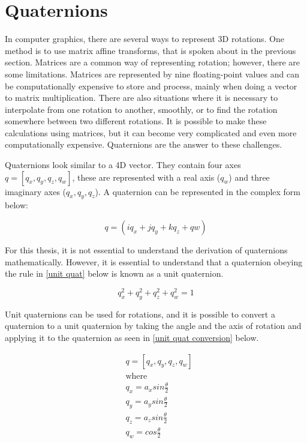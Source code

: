 \section{Quaternions}

In computer graphics, there are several ways to represent 3D rotations. One method is to use matrix affine transforms, that is spoken about in the previous section. Matrices are a common way of representing rotation; however, there are some limitations. Matrices are represented by nine floating-point values and can be computationally expensive to store and process, mainly when doing a vector to matrix multiplication. There are also situations where it is necessary to interpolate from one rotation to another, smoothly, or to find the rotation somewhere between two different rotations. It is possible to make these calculations using matrices, but it can become very complicated and even more computationally expensive. Quaternions are the answer to these challenges.

Quaternions look similar to a 4D vector. They contain four axes $q = [q_x, q_y, q_z, q_w]$, these are represented with a real axis ($q_w$) and three imaginary axes ($q_x, q_y, q_z$). A quaternion can be represented in the complex form below: 

\begin{equation}
q = (iq_x + jq_y + kq_z + qw)
\end{equation}

\noindent
For this thesis, it is not essential to understand the derivation of quaternions mathematically. However, it is essential to understand that a quaternion obeying the rule in \ref{unit quat} below is known as a unit quaternion.

\begin{equation} \label{unit quat}
	q_x^2 + q_y^2 + q_z^2 + q_w^2 = 1
\end{equation}

\noindent
Unit quaternions can be used for rotations, and it is possible to convert a quaternion to a unit quaternion by taking the angle and the axis of rotation and applying it to the quaternion as seen in \ref{unit quat conversion} below.

\begin{equation} \label{unit quat conversion}
\begin{aligned}
& q = [q_x, q_y, q_z, q_w]\\
& \text{where} \\
& q_x = a_x sin \frac{\theta}{2}\\
& q_y = a_y sin \frac{\theta}{2}\\
& q_z = a_z sin \frac{\theta}{2}\\
& q_w = cos \frac{\theta}{2}
\end{aligned}
\end{equation}

